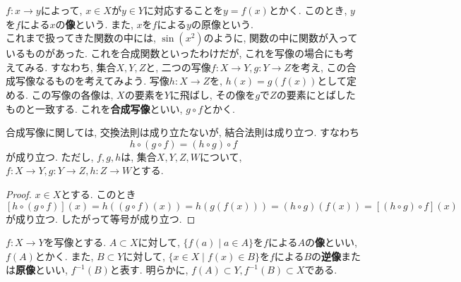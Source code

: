 \documentclass[a4j,dvipdfmx]{jsarticle}
\numberwithin{equation}{section}
\begin{document}
            $f:x\rightarrow y$によって, $x\in X$が$y\in Y$に対応することを$y=f(x)$とかく. このとき, $y$を$f$による$x$の\textbf{像}という. また, $x$を$f$による$y$の原像という.\\

            これまで扱ってきた関数の中には, $\sin(x^2)$のように, 関数の中に関数が入っているものがあった. これを合成関数といったわけだが, これを写像の場合にも考えてみる. すなわち, 集合$X,Y,Z$と, 
            二つの写像$f:X\rightarrow Y, g:Y\rightarrow Z$を考え, この合成写像なるものを考えてみよう. 写像$h:X\rightarrow Z$を, $h(x)=g(f(x))$として定める. この写像の各像は, $X$の要素を$Y$に飛ばし, 
            その像を$g$で$Z$の要素にとばしたものと一致する. これを\textbf{合成写像}といい, $g\circ f$とかく.
            
            合成写像に関しては, 交換法則は成り立たないが, 結合法則は成り立つ. すなわち
            \begin{equation}
                h\circ (g\circ f) = (h\circ g)\circ f \label{eq:集合論基礎:合成写像の結合法則}
            \end{equation}
            が成り立つ. ただし, $f,g,h$は, 集合$X,Y,Z,W$について, $f:X\rightarrow Y, g:Y\rightarrow Z, h:Z\rightarrow W$とする.
            \begin{proof}
                $x\in X$とする. このとき\[ [h\circ (g\circ f)](x)=h((g\circ f)(x))=h(g(f(x)))=(h\circ g)(f(x))=[(h\circ g)\circ f](x)\]
                が成り立つ. したがって等号が成り立つ.
            \end{proof}
            $f:X\rightarrow Y$を写像とする. $A\subset X$に対して, $\{f(a)\mid a\in A\}$を$f$による$A$の\textbf{像}といい, $f(A)$とかく. また, $B\subset Y$に対して, 
            $\{x\in X\mid f(x)\in B\}$を$f$による$B$の\textbf{逆像}または\textbf{原像}といい, $f^{-1}(B)$と表す. 明らかに, $f(A)\subset Y,f^{-1}(B)\subset X$である.
\end{document}
